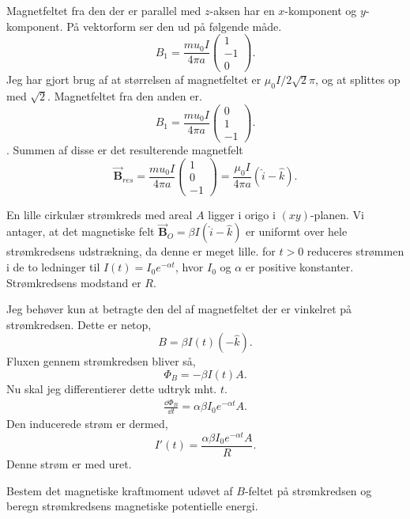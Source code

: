 \begin{solution}
Magnetfeltet fra den der er parallel med $z$-aksen har en $x$-komponent og $y$-komponent. På vektorform ser den ud på følgende måde.
 \[
B_1 = \frac{mu_0I}{4\pi a}\begin{pmatrix}1 \\ -1 \\ 0\end{pmatrix} 
.\]
Jeg har gjort brug af at størrelsen af magnetfeltet er $\mu_0I / 2\sqrt{2} \pi$, og at splittes op med $\sqrt{2}$.
Magnetfeltet fra den anden er.
 \[
B_1 = \frac{mu_0I}{4\pi a}\begin{pmatrix}0 \\ 1 \\ -1\end{pmatrix} 
.\].
Summen af disse er det resulterende magnetfelt
\[
\vec{\mathbf{B}}_{res} = \frac{mu_0I}{4\pi a} \begin{pmatrix}1 \\ 0 \\ -1  \end{pmatrix} = \frac{\mu_0 I}{4\pi a}\left( \hat{i}- \hat{k} \right)  
.\] 
\end{solution}
\begin{subexercise}[b]
En lille cirkulær strømkreds med areal $A$ ligger i origo i $\left( xy \right) $-planen. Vi antager, at det magnetiske felt $\vec{\mathbf{B}} _O = \beta I\left( \hat{i}-\hat{k} \right) $ er uniformt over hele strømkredsens udstrækning, da denne er meget lille. for $t>0$ reduceres strømmen i de to ledninger til $I\left( t \right) = I_0e^{-\alpha t}$, hvor $I_0$ og $\alpha $ er positive konstanter. Strømkredsens modstand er $R$.
\end{subexercise}
\begin{solution}
Jeg behøver kun at betragte den del af magnetfeltet der er vinkelret på strømkredsen. Dette er netop,
\[
B = \beta I\left( t \right)  \left( -\hat{k} \right) 
.\]
Fluxen gennem strømkredsen bliver så,
\[
\Phi_B = -\beta I\left( t \right)  A
.\] 
Nu skal jeg differentierer dette udtryk mht. $t$.
 \begin{align*}
	\frac{\dd \Phi_B}{\dd t }= \alpha \beta I_0e^{-\alpha t}A
.\end{align*}
Den inducerede strøm er dermed,
\[
I'\left( t \right) = \frac{\alpha \beta I_0e^{-\alpha t}A}{R}
.\] 
Denne strøm er med uret.
\end{solution}
\begin{subexercise}[c]
Bestem det magnetiske kraftmoment udøvet af $B$-feltet på strømkredsen og beregn strømkredsens magnetiske potentielle energi.
\end{subexercise}
